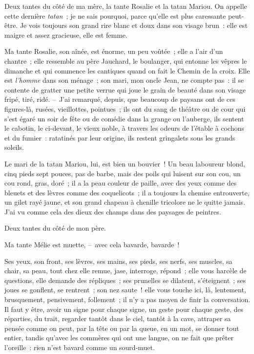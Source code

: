 \documentclass[french,twoside]{book} %
\begin{document}
\noindent Deux tantes du côté de ma mère, la tante Rosalie et la tatan Mariou. On appelle cette dernière \emph{tatan} ; je ne sais pourquoi, parce qu’elle est plus caressante peut-être. Je vois toujours son grand rire blanc et doux dans son visage brun : elle est maigre et assez gracieuse, elle est femme.\par
Ma tante Rosalie, son aînée, est énorme, un peu voûtée ; elle a l’air d’un chantre ; elle ressemble au père Jauchard, le boulanger, qui entonne les vêpres le dimanche et qui commence les cantiques quand on fait le Chemin de la croix. Elle est \emph{l’homme} dans son ménage ; son mari, mon oncle Jean, ne compte pas : il se contente de gratter une petite verrue qui joue le grain de beauté dans son visage fripé, tiré, ridé. – J’ai remarqué, depuis, que beaucoup de paysans ont de ces figures-là, rusées, vieillottes, pointues ; ils ont du sang de théâtre ou de cour qui s’est égaré un soir de fête ou de comédie dans la grange ou l’auberge, ils sentent le cabotin, le ci-devant, le vieux noble, à travers les odeurs de l’étable à cochons et du fumier : ratatinés par leur origine, ils restent gringalets sous les grands soleils.\par
Le mari de la tatan Mariou, lui, est bien un bouvier ! Un beau laboureur blond, cinq pieds sept pouces, pas de barbe, mais des poils qui luisent sur son cou, un cou rond, gras, doré ; il a la peau couleur de paille, avec des yeux comme des bleuets et des lèvres comme des coquelicots ; il a toujours la chemise entrouverte, un gilet rayé jaune, et son grand chapeau à chenille tricolore ne le quitte jamais. J’ai vu comme cela des dieux des champs dans des paysages de peintres.\par
Deux tantes du côté de mon père.\par
Ma tante Mélie est muette, – avec cela bavarde, bavarde !\par
Ses yeux, son front, ses lèvres, ses mains, ses pieds, ses nerfs, ses muscles, sa chair, sa peau, tout chez elle remue, jase, interroge, répond ; elle vous harcèle de questions, elle demande des répliques ; ses prunelles se dilatent, s’éteignent ; ses joues se gonflent, se rentrent ; son nez saute ! elle vous touche ici, là, lentement, brusquement, pensivement, follement ; il n’y a pas moyen de finir la conversation. Il faut y être, avoir un signe pour chaque signe, un geste pour chaque geste, des réparties, du trait, regarder tantôt dans le ciel, tantôt à la cave, attraper sa pensée comme on peut, par la tête ou par la queue, en un mot, se donner tout entier, tandis qu’avec les commères qui ont une langue, on ne fait que prêter l’oreille : rien n’est bavard comme un sourd-muet.\par
\end{document}
